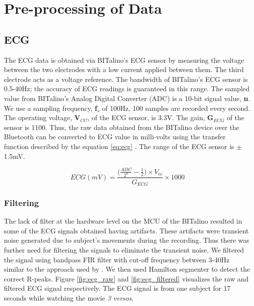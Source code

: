 \section{Pre-processing of Data}
\label{sec:preprocessing}
\subsection{ECG}
\label{sec:ecg_feature_extraction}
The ECG data is obtained via BITalino's ECG sensor by measuring the voltage between the two electrodes with a low current applied between them. The third electrode acts as a voltage reference. The bandwidth of BITalino's ECG sensor is 0.5-40Hz; the accuracy of ECG readings is guaranteed in this range. The sampled value from BITalino's Analog Digital Converter (ADC) is a 10-bit signal value, \textbf{n}. We use a sampling frequency, \textbf{f$_{s}$} of 100Hz, 100 samples are recorded every second. The operating voltage, \textbf{V$_{CC}$}, of the ECG sensor, is 3.3V. The gain, \textbf{G$_{ECG}$} of the sensor is 1100. Thus, the raw data obtained from the BITalino device over the Bluetooth can be converted to ECG value in milli-volts using the transfer function described by the equation \ref{eq:ecg} \cite{ecg_datasheet}. The range of the ECG sensor is $\pm$1.5mV.

\begin{equation}
\label{eq:ecg}
    ECG(mV) = \frac{\big(\frac{ADC}{2^n} - \frac{1}{2})\times V_{cc}} {G_{ECG}}\times1000
\end{equation}

\subsubsection{Filtering} The lack of filter at the hardware level on the MCU \cite{noauthor_faq_nodate} of the BITalino resulted in some of the ECG signals obtained having artifacts. These artifacts were transient noise generated due to subject's movements during the recording. Thus there was further need for filtering the signals to eliminate the transient noise. We filtered the signal using bandpass FIR filter with cut-off frequency between 3-40Hz similar to the approach used by \citeauthor{canento_review_nodate} \cite{canento_review_nodate}. We then used Hamilton segmenter \cite{hamilton_open_2002} to detect the correct R-peaks. Figure \ref{fig:ecg_raw} and \ref{fig:ecg_filtered} visualizes the raw and filtered ECG signal respectively. The ECG signal is from one subject for 17 seconds while watching the movie \textit{3 versos}.

